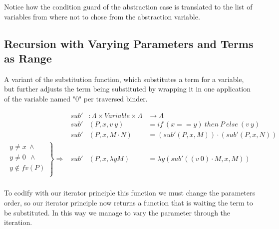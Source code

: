 \documentclass{article}
\begin{document}
Notice how the condition guard of the abstraction case is translated to the list of variables from where not to chose from the abstraction variable.

 \hspace{5px}

\subsection{Recursion with Varying Parameters and Terms as Range}

A variant of the substitution function, which substitutes a term for a variable, but further adjusts the term being substituted by wrapping it in one application of the variable named "0" per traversed binder.

\[
\begin{array}{rrll}
&sub' &: \Lambda \times Variable \times  \Lambda &   \rightarrow  \Lambda  \\
&sub' &(P , x , v\ y)         &= if\ (x == y)\ then\ P\ else\ (v\ y)   \\
&sub' &(P , x , M \cdot N)    &= (sub' (P , x , M)) \cdot (sub' (P , x , N)) \\
\left. 
\begin{array}{c}
y \neq x  \ \wedge \\
 y \neq 0\ \  \wedge \\
 y \not\in fv(P) \\
\end{array} \right\} \Rightarrow&sub' &(P , x , \lambda y M)   &= \lambda y (sub' ((v\ 0) \cdot M , x , M)) \\
\end{array} \]


To codify with our iterator principle this function we must change the parameters order, so our iterator principle now returns a function that is waiting the term to be substituted. In this way we manage to vary the parameter through the iteration.

 \hspace{5px}
\end{document}

